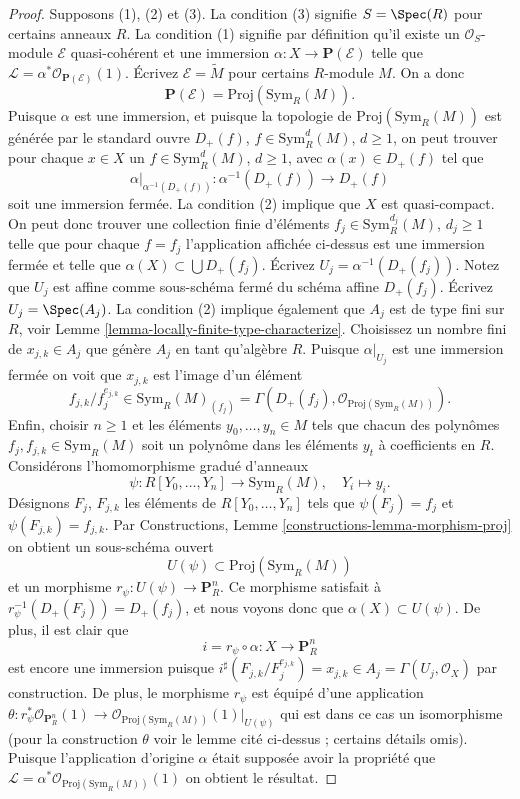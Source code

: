 \begin{proof}
Supposons (1), (2) et
(3). La condition (3) signifie $S = \Spec(R)$ pour
certains anneaux $R$.
La condition (1) signifie par définition
qu'il existe un $\mathcal{O}_S$-module $\mathcal{E}$ quasi-cohérent
et une immersion $\alpha : X \to \mathbf{P}(\mathcal{E})$ telle que $\mathcal{L} = \alpha^*\mathcal{O}_{\mathbf{P}(\mathcal{E})}(1)$. Écrivez $\mathcal{E} = \widetilde{M}$
pour certains $R$-module $M$.
On a donc
$$
\mathbf{P}(\mathcal{E}) = \text{Proj}(\text{Sym}_R(M)).
$$
Puisque $\alpha$ est une immersion, et puisque
la topologie de $\text{Proj}(\text{Sym}_R(M))$ est générée par le standard
ouvre $D_{+}(f)$, $f \in \text{Sym}_R^d(M)$, $d \geq 1$,
on peut trouver pour chaque
$x \in X$ un $f \in \text{Sym}_R^d(M)$, $d \geq 1$, avec $\alpha(x) \in D_{+}(f)$ tel
que
$$
\alpha|_{\alpha^{-1}(D_{+}(f))} : \alpha^{-1}(D_{+}(f)) \to D_{+}(f)
$$
soit une immersion fermée.
La condition (2) implique que $X$ est quasi-compact.
On peut donc trouver
une collection finie d'éléments $f_j \in \text{Sym}_R^{d_j}(M)$,
$d_j \geq 1$ telle que pour chaque $f = f_j$ l'application
affichée ci-dessus est une immersion fermée et telle que
$\alpha(X) \subset \bigcup D_{+}(f_j)$. Écrivez $U_j = \alpha^{-1}(D_{+}(f_j))$. Notez que $U_j$ est affine
comme sous-schéma fermé du schéma affine $D_{+}(f_j)$.
Écrivez $U_j = \Spec(A_j)$. La condition (2) implique également
que $A_j$ est de type
fini sur $R$, voir Lemme \ref{lemma-locally-finite-type-characterize}. Choisissez
un nombre fini de $x_{j, k} \in A_j$ que
génère $A_j$ en tant qu'algèbre $R$. Puisque $\alpha|_{U_j}$ est une
immersion fermée on voit que $x_{j, k}$ est l'image d'un élément
$$
f_{j, k}/f_j^{e_{j, k}} \in \text{Sym}_R(M)_{(f_j)}
=
\Gamma(D_{+}(f_j), \mathcal{O}_{\text{Proj}(\text{Sym}_R(M))}).
$$
Enfin, choisir $n \geq 1$ et les éléments $y_0, \ldots, y_n \in M$ tels que chacun des polynômes
$f_j, f_{j, k} \in \text{Sym}_R(M)$ soit un polynôme dans les éléments $y_t$ à coefficients
en $R$. Considérons l'homomorphisme
gradué d'anneaux
$$
\psi : R[Y_0, \ldots, Y_n] \longrightarrow \text{Sym}_R(M),
\quad Y_i \longmapsto y_i.
$$
Désignons $F_j$, $F_{j, k}$ les éléments de $R[Y_0, \ldots, Y_n]$
tels que $\psi(F_j) = f_j$ et $\psi(F_{j, k}) = f_{j, k}$.
Par Constructions, Lemme \ref{constructions-lemma-morphism-proj} on obtient un
sous-schéma ouvert
$$
U(\psi) \subset \text{Proj}(\text{Sym}_R(M))
$$
et un morphisme
$r_\psi : U(\psi) \to \mathbf{P}^n_R$. Ce morphisme satisfait
à $r_\psi^{-1}(D_{+}(F_j)) = D_{+}(f_j)$, et nous voyons donc que
$\alpha(X) \subset U(\psi)$. De plus, il est clair
que
$$
i = r_\psi \circ \alpha : X \longrightarrow \mathbf{P}^n_R
$$
est encore une immersion
puisque $i^\sharp(F_{j, k}/F_j^{e_{j, k}}) = x_{j, k} \in
A_j = \Gamma(U_j, \mathcal{O}_X)$ par construction.
De plus, le morphisme $r_\psi$ est équipé d'une application
$\theta : r_\psi^*\mathcal{O}_{\mathbf{P}^n_R}(1)
\to \mathcal{O}_{\text{Proj}(\text{Sym}_R(M))}(1)|_{U(\psi)}$ qui est dans ce
cas un isomorphisme (pour la construction
$\theta$ voir le lemme cité ci-dessus
; certains détails omis). Puisque
l'application d'origine $\alpha$
était
supposée avoir la propriété que $\mathcal{L} = \alpha^*\mathcal{O}_{\text{Proj}(\text{Sym}_R(M))}(1)$
on obtient le résultat.
\end{proof}

